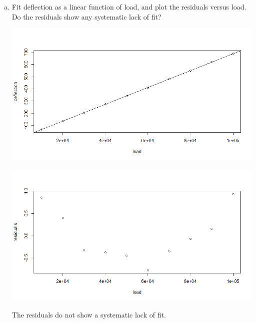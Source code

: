 \documentclass{article}
\begin{document}
\begin{itemize}
\begin{enumerate}[a.]
			\item Fit deflection as a linear function of load, and plot the residuals versus load. Do the residuals show any systematic lack of fit?
				\begin{center}
					\includegraphics[width=14cm]{reg_load_def.png}
				\end{center}
				\begin{center}
					\includegraphics[width=14cm]{load_resid.png}
				\end{center}
				\begin{answer*}
					The residuals do not show a systematic lack of fit.
				\end{answer*}

		\end{enumerate}

\end{itemize}
\end{document}
